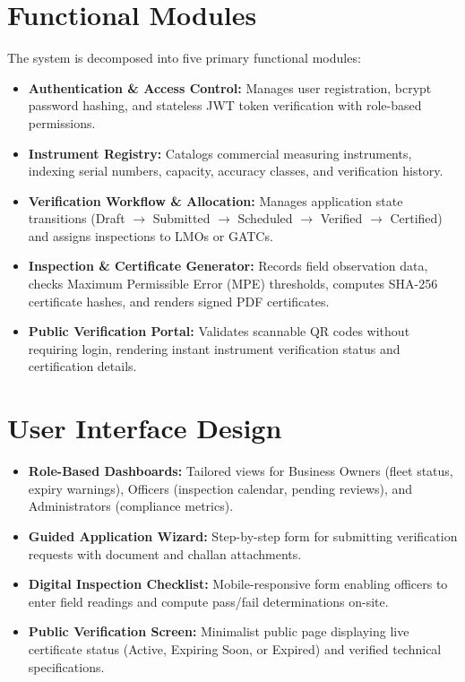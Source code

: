 \section{Functional Modules}
The system is decomposed into five primary functional modules:
\begin{itemize}
    \item \textbf{Authentication \& Access Control:} Manages user registration, bcrypt password hashing, and stateless JWT token verification with role-based permissions.
    \item \textbf{Instrument Registry:} Catalogs commercial measuring instruments, indexing serial numbers, capacity, accuracy classes, and verification history.
    \item \textbf{Verification Workflow \& Allocation:} Manages application state transitions (Draft $\rightarrow$ Submitted $\rightarrow$ Scheduled $\rightarrow$ Verified $\rightarrow$ Certified) and assigns inspections to LMOs or GATCs.
    \item \textbf{Inspection \& Certificate Generator:} Records field observation data, checks Maximum Permissible Error (MPE) thresholds, computes SHA-256 certificate hashes, and renders signed PDF certificates.
    \item \textbf{Public Verification Portal:} Validates scannable QR codes without requiring login, rendering instant instrument verification status and certification details.
\end{itemize}

\section{User Interface Design}
\begin{itemize}
    \item \textbf{Role-Based Dashboards:} Tailored views for Business Owners (fleet status, expiry warnings), Officers (inspection calendar, pending reviews), and Administrators (compliance metrics).
    \item \textbf{Guided Application Wizard:} Step-by-step form for submitting verification requests with document and challan attachments.
    \item \textbf{Digital Inspection Checklist:} Mobile-responsive form enabling officers to enter field readings and compute pass/fail determinations on-site.
    \item \textbf{Public Verification Screen:} Minimalist public page displaying live certificate status (Active, Expiring Soon, or Expired) and verified technical specifications.
\end{itemize}

